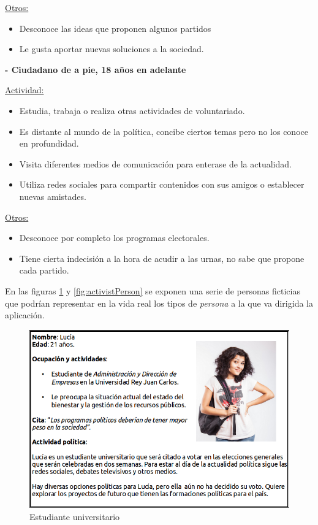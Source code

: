 \underline{Otros:}

\begin{itemize}
\item Desconoce las ideas que proponen algunos partidos 
\item Le gusta aportar nuevas soluciones a la sociedad.
\end{itemize}

\textbf{- Ciudadano de a pie, 18 años en adelante}

\underline{Actividad:}

\begin{itemize}
\item Estudia, trabaja o realiza otras actividades de voluntariado.
\item Es distante al mundo de la política, concibe ciertos temas pero no los conoce en profundidad.
\item Visita diferentes medios de comunicación para enterase de la actualidad.
\item Utiliza redes sociales para compartir contenidos con sus amigos o establecer nuevas amistades.
\end{itemize}

\underline{Otros:}

\begin{itemize}
\item Desconoce por completo los programas electorales. 
\item Tiene cierta indecisión a la hora de acudir a las urnas, no sabe que propone cada partido.
\end{itemize}

En las figuras \ref{fig:studentPerson} y \ref{fig:activistPerson} se exponen una serie de personas ficticias que podrían representar en la vida real los tipos de \textit{persona} a la que va dirigida la aplicación.

	\begin{figure}[H]
      \centering
	\includegraphics[keepaspectratio, scale=0.5]{Media/Captures/person1.png}
      \caption{Estudiante universitario}
      \label{fig:studentPerson}
    \end{figure}
    
